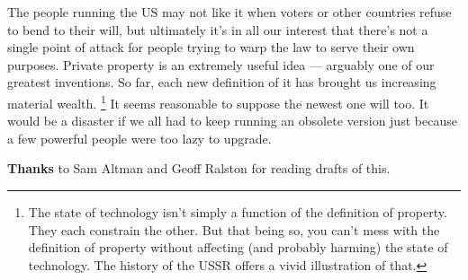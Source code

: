 The people running the US may not like it when voters or other countries
refuse to bend to their will, but ultimately it's in all our interest
that there's not a single point of attack for people trying to warp the
law to serve their own purposes. Private property is an extremely useful
idea --- arguably one of our greatest inventions. So far, each new
definition of it has brought us increasing material wealth.
\footnote{The state of technology isn't simply a function of the
definition of property. They each constrain the other. But that being
so, you can't mess with the definition of property without affecting
(and probably harming) the state of technology. The history of the USSR
offers a vivid illustration of that.} It seems reasonable to suppose the newest one
will too. It would be a disaster if we all had to keep running an
obsolete version just because a few powerful people were too lazy to
upgrade.


\textbf{Thanks} to Sam Altman and Geoff Ralston for reading drafts of
this.